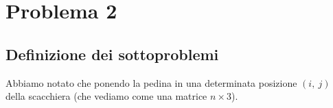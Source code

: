 \section{Problema 2}

\subsection{Definizione dei sottoproblemi}

Abbiamo notato che ponendo la pedina in una determinata posizione $(i,\ j)$
della scacchiera (che vediamo come una matrice $n \times 3$).